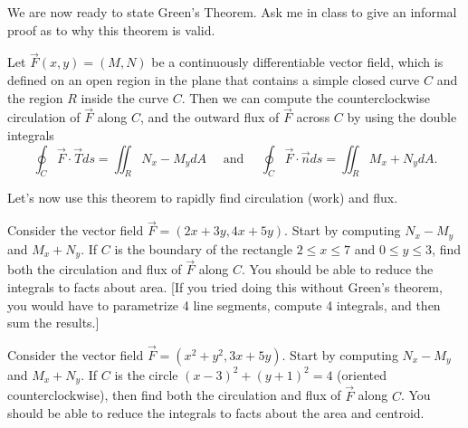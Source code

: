 We are now ready to state Green's Theorem.  Ask me in class to give an informal proof as to why this theorem is valid.
\begin{theorem}
 Let $\vec F(x,y)=(M,N)$ be a continuously differentiable vector field, which is defined on an open region in the plane that contains a simple closed curve $C$ and the region $R$ inside the curve $C$.  Then we can compute the counterclockwise circulation of $\vec F$ along $C$, and the outward flux of $\vec F$ across $C$ by using the double integrals
$$ \oint_{C} \vec F \cdot \vec T ds=\iint_R N_x-M_y dA 
\quad \text{ and } \quad 
\oint_{C} \vec F \cdot \vec n ds=\iint_R M_x+N_y dA.$$
\end{theorem}

Let's now use this theorem to rapidly find circulation (work) and flux.


\begin{problem}
%
 Consider the vector field $\vec F=(2x+3y,4x+5y)$. Start by computing $N_x-M_y$ and $M_x+N_y$. 
 If $C$ is the boundary of the rectangle $2\leq x\leq 7$ and $0\leq y\leq 3$, find both the circulation and flux of $\vec F$ along $C$. You should be able to reduce the integrals to facts about area. [If you tried doing this without Green's theorem, you would have to parametrize 4 line segments, compute 4 integrals, and then sum the results.]
\end{problem}

\begin{problem}
 Consider the vector field $\vec F=(x^2+y^2,3x+5y)$. Start by computing $N_x-M_y$ and $M_x+N_y$. 
 If $C$ is the circle $(x-3)^2+(y+1)^2=4$ (oriented counterclockwise), then find both the circulation and flux of $\vec F$ along $C$. You should be able to reduce the integrals to facts about the area and centroid.
\end{problem}

